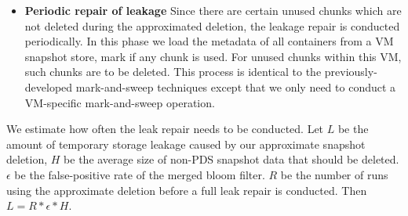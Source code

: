 \begin{itemize}
\item {\bf Periodic repair of leakage}
Since there are certain unused chunks which are not deleted during
the approximated deletion, the leakage repair is conducted periodically.
In this phase we load the metadata of all containers from a VM snapshot store,
mark if any chunk is used.  For unused chunks within this VM, such chunks are to be deleted.
This process is identical to the previously-developed mark-and-sweep techniques except that
we only need to conduct a VM-specific mark-and-sweep  operation.
\end{itemize}





%



We estimate how often the leak repair needs to be conducted.
Let $L$ be the amount of temporary storage leakage caused by our approximate snapshot deletion, 
$H$ be the average size of non-PDS snapshot data that should be deleted. 
$\epsilon$ be the false-positive rate of the merged bloom filter. 
$R$ be the number of runs using the approximate deletion before a full leak repair is conducted.
Then $ L= R * \epsilon * H.  $



